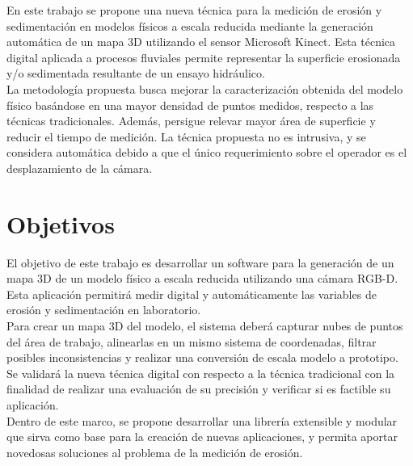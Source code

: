 En este trabajo se propone una nueva técnica para la medición de erosión y sedimentación en modelos físicos a escala reducida mediante la generación automática de un mapa 3D utilizando el sensor Microsoft Kinect. Esta técnica digital aplicada a procesos fluviales permite representar la superficie erosionada y/o sedimentada resultante de un ensayo hidráulico. \\
La metodología propuesta busca mejorar la caracterización obtenida del modelo físico basándose en una mayor densidad de puntos medidos, respecto a las técnicas tradicionales. Además, persigue relevar mayor área de superficie y reducir el tiempo de medición. La técnica propuesta no es intrusiva, y se considera automática debido a que el único requerimiento sobre el operador es el desplazamiento de la cámara.

\section{Objetivos}
\label{S:objetivos}

El objetivo de este trabajo es desarrollar un software para la generación de un mapa 3D de un modelo físico a escala reducida utilizando una cámara RGB-D. Esta aplicación permitirá medir digital y automáticamente las variables de erosión y sedimentación en laboratorio. \\
  Para crear un mapa 3D del modelo, el sistema deberá capturar nubes de puntos del área de trabajo, alinearlas en un mismo sistema de coordenadas, filtrar posibles inconsistencias y realizar una conversión de escala modelo a prototipo. \\
  Se validará la nueva técnica digital con respecto a la técnica tradicional con la finalidad de realizar una evaluación de su precisión y verificar si es factible su aplicación. \\
  Dentro de este marco, se propone desarrollar una librería extensible y modular que sirva como base para la creación de nuevas aplicaciones, y permita aportar novedosas soluciones al problema de la medición de erosión. \\

